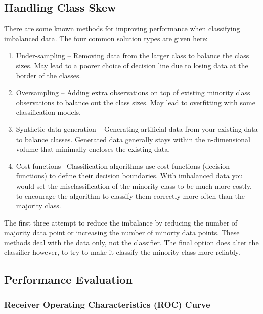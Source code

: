 \documentclass{article}
\begin{document}
\subsection{Handling Class Skew}
There are some known methods for improving performance when classifying imbalanced data. The four common solution types are given here:
\begin{enumerate}
\item Under-sampling -- Removing data from the larger class to balance the class sizes.
May lead to a poorer choice of decision line due to losing data at the border of the classes.
\item Oversampling -- Adding extra observations on top of existing minority class observations to balance out the class sizes.
May lead to overfitting with some classification models.
\item Synthetic data generation -- Generating artificial data from your existing data to balance classes.
Generated data generally stays within the n-dimensional volume that minimally encloses the existing data.
\item Cost functions-- Classification algorithms use cost functions (decision functions) to define their decision boundaries.
With imbalanced data you would set the misclassification of the minority class to be much more costly, to encourage the algorithm to classify them correctly more often than the majority class.
\end{enumerate}
The first three attempt to reduce the imbalance by reducing the number of majority data point or increasing the number of minorty data points.
These methods deal with the data only, not the classifier.
The final option does alter the classifier however, to try to make it classify the minority class more reliably.

\subsection{Performance Evaluation}

\subsubsection{Receiver Operating Characteristics (ROC) Curve}
\end{document}
